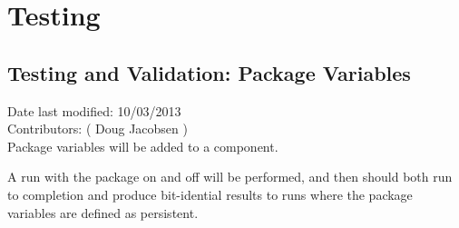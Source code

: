 \documentclass[11pt]{report}
\begin{document}

\chapter{Testing}

\section{Testing and Validation: Package Variables}
Date last modified: 10/03/2013 \\
Contributors: ( Doug Jacobsen ) \\

Package variables will be added to a component.

A run with the package on and off will be performed, and then should both run
to completion and produce bit-idential results to runs where the package
variables are defined as persistent.

\end{document}
